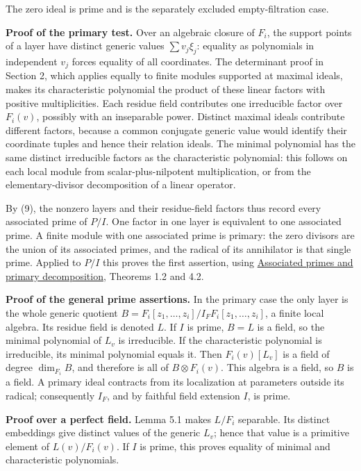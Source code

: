 \documentclass[
]{article}
\begin{document}
The zero ideal is prime and is the separately excluded empty-filtration
case.

\textbf{Proof of the primary test.} Over an algebraic closure of
\(F_i\), the support points of a layer have distinct generic values
\(\sum v_j\xi_j\): equality as polynomials in independent \(v_j\) forces
equality of all coordinates. The determinant proof in Section 2, which
applies equally to finite modules supported at maximal ideals, makes its
characteristic polynomial the product of these linear factors with
positive multiplicities. Each residue field contributes one irreducible
factor over \(F_i(v)\), possibly with an inseparable power. Distinct
maximal ideals contribute different factors, because a common conjugate
generic value would identify their coordinate tuples and hence their
relation ideals. The minimal polynomial has the same distinct
irreducible factors as the characteristic polynomial: this follows on
each local module from scalar-plus-nilpotent multiplication, or from the
elementary-divisor decomposition of a linear operator.

By (9), the nonzero layers and their residue-field factors thus record
every associated prime of \(P/I\). One factor in one layer is equivalent
to one associated prime. A finite module with one associated prime is
primary: the zero divisors are the union of its associated primes, and
the radical of its annihilator is that single prime. Applied to \(P/I\)
this proves the first assertion, using
\href{../prerequisites/AG-CA/AG-CA-04.html}{Associated primes and
primary decomposition}, Theorems 1.2 and 4.2.

\textbf{Proof of the general prime assertions.} In the primary case the
only layer is the whole generic quotient
\(B=F_i[z_1,\ldots,z_i]/I_FF_i[z_1,\ldots,z_i]\), a finite local
algebra. Its residue field is denoted \(L\). If \(I\) is prime, \(B=L\)
is a field, so the minimal polynomial of \(L_v\) is irreducible. If the
characteristic polynomial is irreducible, its minimal polynomial equals
it. Then \(F_i(v)[L_v]\) is a field of degree \(\dim_{F_i}B\), and
therefore is all of \(B\otimes F_i(v)\). This algebra is a field, so
\(B\) is a field. A primary ideal contracts from its localization at
parameters outside its radical; consequently \(I_F\), and by faithful
field extension \(I\), is prime.

\textbf{Proof over a perfect field.} Lemma 5.1 makes \(L/F_i\)
separable. Its distinct embeddings give distinct values of the generic
\(L_v\); hence that value is a primitive element of \(L(v)/F_i(v)\). If
\(I\) is prime, this proves equality of minimal and characteristic
polynomials.
\end{document}
